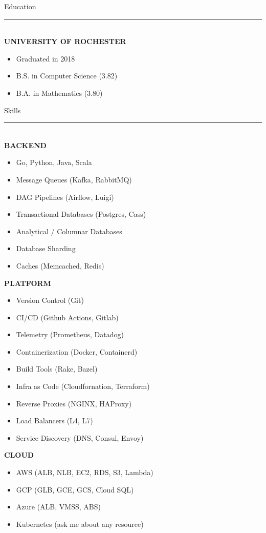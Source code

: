 \documentclass[letterpaper]{article}
\makeatletter
\newcommand{\fillbox}[1]{\resizebox{\textwidth}{!}{\begin{tabular}{@{}l@{}} #1 \end{tabular}}}
\makeatother
\begin{document}
	\noindent{}\noindent
	\begin{bgbox}[height=\paperheight, colback=gray!15, width=0.38\textwidth, left=0.12in, right=0.11in]\raggedright
		\vspace*{-4pt}
		\fillbox{\thin Brandon\\[-6pt] \thin Willett}\vspace*{12pt}
		{\Huge{Education}}\\[-6pt]
		\noindent\rule{\textwidth}{1pt}\\[12pt]
		\textbf{UNIVERSITY OF ROCHESTER}
		\begin{itemize} [noitemsep,topsep=4pt]
			\item Graduated in 2018
			\item B.S. in Computer Science (3.82)
			\item B.A. in Mathematics (3.80)
		\end{itemize}
		\vspace*{24pt}
		{\Huge{Skills}}\\[-6pt]
		\noindent\rule{\textwidth}{1pt}\\[12pt]
		\textbf{BACKEND}
		\begin{itemize} [noitemsep,topsep=4pt]
			\item Go, Python, Java, Scala
			\item Message Queues (Kafka, RabbitMQ)
			\item DAG Pipelines (Airflow, Luigi)
			\item Transactional Databases (Postgres, Cass)
			\item Analytical / Columnar Databases
			\item Database Sharding
			\item Caches (Memcached, Redis)
		\end{itemize}
		\vspace*{12pt}
		\textbf{PLATFORM}
		\begin{itemize} [noitemsep,topsep=4pt]
			\item Version Control (Git)
			\item CI/CD (Github Actions, Gitlab)
			\item Telemetry (Prometheus, Datadog)
			\item Containerization (Docker, Containerd)
			\item Build Tools (Rake, Bazel)
			\item Infra as Code (Cloudfornation, Terraform)
			\item Reverse Proxies (NGINX, HAProxy)
			\item Load Balancers (L4, L7)
			\item Service Discovery (DNS, Consul, Envoy)
		\end{itemize}
		\vspace*{12pt}
		\textbf{CLOUD}
		\begin{itemize} [noitemsep,topsep=4pt]
			\item AWS (ALB, NLB, EC2, RDS, S3, Lambda)
			\item GCP (GLB, GCE, GCS, Cloud SQL)
			\item Azure (ALB, VMSS, ABS)
			\item Kubernetes (ask me about any resource)
		\end{itemize}
	\end{bgbox}%
\end{document}
